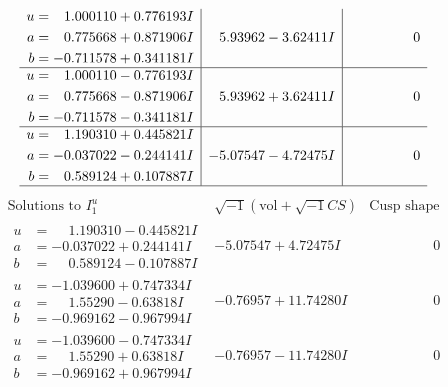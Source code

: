 \documentclass[1p]{elsarticle_modified}
\theoremstyle{definition}
\newcommand{\I}{\sqrt{-1}}
\begin{document}
$$\begin{array}{c|c|c}
\begin{aligned}
u &= \phantom{-}1.000110 + 0.776193 I \\
a &= \phantom{-}0.775668 + 0.871906 I \\
b &= -0.711578 + 0.341181 I\end{aligned}
 & \phantom{-}5.93962 - 3.62411 I & \phantom{-0.000000 } 0 \\ \hline\begin{aligned}
u &= \phantom{-}1.000110 - 0.776193 I \\
a &= \phantom{-}0.775668 - 0.871906 I \\
b &= -0.711578 - 0.341181 I\end{aligned}
 & \phantom{-}5.93962 + 3.62411 I & \phantom{-0.000000 } 0 \\ \hline\begin{aligned}
u &= \phantom{-}1.190310 + 0.445821 I \\
a &= -0.037022 - 0.244141 I \\
b &= \phantom{-}0.589124 + 0.107887 I\end{aligned}
 & -5.07547 - 4.72475 I & \phantom{-0.000000 } 0\\
 \hline 
 \end{array}$$\newpage$$\begin{array}{c|c|c}  
\text{Solutions to }I^u_{1}& \I (\text{vol} + \sqrt{-1}CS) & \text{Cusp shape}\\
 \hline 
\begin{aligned}
u &= \phantom{-}1.190310 - 0.445821 I \\
a &= -0.037022 + 0.244141 I \\
b &= \phantom{-}0.589124 - 0.107887 I\end{aligned}
 & -5.07547 + 4.72475 I & \phantom{-0.000000 } 0 \\ \hline\begin{aligned}
u &= -1.039600 + 0.747334 I \\
a &= \phantom{-}1.55290 - 0.63818 I \\
b &= -0.969162 - 0.967994 I\end{aligned}
 & -0.76957 + 11.74280 I & \phantom{-0.000000 } 0 \\ \hline\begin{aligned}
u &= -1.039600 - 0.747334 I \\
a &= \phantom{-}1.55290 + 0.63818 I \\
b &= -0.969162 + 0.967994 I\end{aligned}
 & -0.76957 - 11.74280 I & \phantom{-0.000000 } 0 \\ \hline\begin{aligned}

\end{aligned}
\end{array}$$
\end{document}
